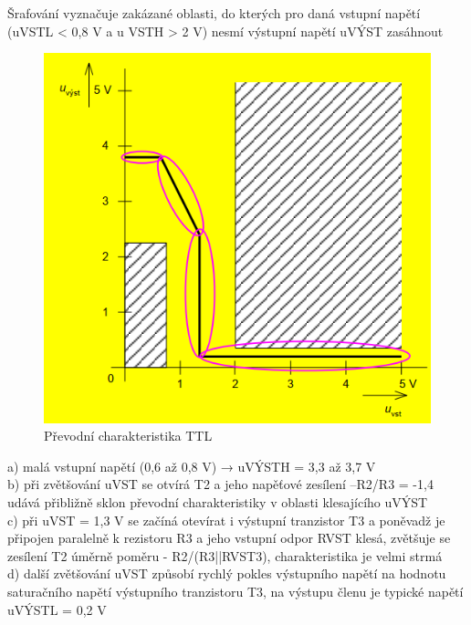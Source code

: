 Šrafování vyznačuje zakázané oblasti, do kterých pro daná
vstupní napětí (uVSTL < 0,8 V a u VSTH > 2 V) nesmí výstupní napětí uVÝST zasáhnout
      \begin{figure}[h]
   \begin{center}
     \includegraphics[scale=0.6]{images/Prevod.png}
   \end{center}
   \caption{Převodní charakteristika TTL}
  \end{figure}
  
a) malá vstupní napětí (0,6 až 0,8 V) → uVÝSTH = 3,3 až 3,7 V\\
b) při zvětšování uVST se otvírá T2 a jeho napěťové zesílení –R2/R3 = -1,4 udává
přibližně sklon převodní charakteristiky v oblasti klesajícího uVÝST\\  
c) při uVST = 1,3 V se začíná otevírat i výstupní tranzistor T3 a poněvadž je připojen paralelně k rezistoru R3 a jeho vstupní odpor RVST klesá, zvětšuje se zesílení T2 úměrně poměru - R2/(R3||RVST3), charakteristika je velmi strmá\\
d) další zvětšování uVST způsobí rychlý pokles výstupního napětí na hodnotu saturačního napětí výstupního tranzistoru T3, na výstupu členu je typické napětí uVÝSTL = 0,2 V\\
 
 
 
 
 
 
 
 
 
 
 
 
 
 
 
 
 
 
 
 
 
 
 
 
 
 
 
 
 
 
 














